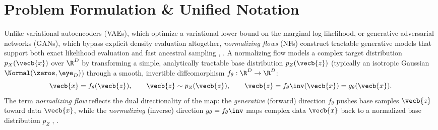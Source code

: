 \documentclass[../../../../master.tex]{subfiles}
\begin{document}

\section{Problem Formulation \& Unified Notation}\label{sec:flow:formulation}

Unlike variational autoencoders (VAEs), which optimize a variational lower bound on the marginal log-likelihood, or generative adversarial networks (GANs), which bypass explicit density evaluation altogether, \emph{normalizing flows} (NFs) construct tractable generative models that support both exact likelihood evaluation and fast ancestral sampling , . A normalizing flow models a complex target distribution $p_X(\vecb{x})$ over $\R^D$ by transforming a simple, analytically tractable base distribution $p_Z(\vecb{z})$ (typically an isotropic Gaussian $\Normal(\zeros, \eye_D)$) through a smooth, invertible diffeomorphism $f_\theta : \R^D \to \R^D$:
\begin{equation}\label{eq:flow:generative_map}
  \vecb{x} = f_\theta(\vecb{z}), \qquad \vecb{z} \sim p_Z(\vecb{z}), \qquad \vecb{z} = f_\theta\inv(\vecb{x}) = g_\theta(\vecb{x}).
\end{equation}
The term \emph{normalizing flow} reflects the dual directionality of the map: the \emph{generative} (forward) direction $f_\theta$ pushes base samples $\vecb{z}$ toward data $\vecb{x}$, while the \emph{normalizing} (inverse) direction $g_\theta = f_\theta\inv$ maps complex data $\vecb{x}$ back to a normalized base distribution $p_Z$ , .
\end{document}
